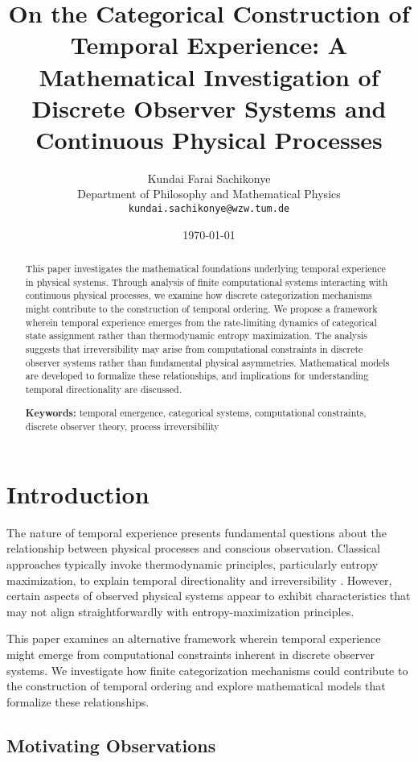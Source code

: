 \documentclass[12pt,a4paper]{article}
\title{On the Categorical Construction of Temporal Experience: A Mathematical Investigation of Discrete Observer Systems and Continuous Physical Processes}
\author{
Kundai Farai Sachikonye\\
Department of Philosophy and Mathematical Physics\\
\texttt{kundai.sachikonye@wzw.tum.de}
}
\date{\today}
\theoremstyle{remark}
\begin{document}
\maketitle

\begin{abstract}
This paper investigates the mathematical foundations underlying temporal experience in physical systems. Through analysis of finite computational systems interacting with continuous physical processes, we examine how discrete categorization mechanisms might contribute to the construction of temporal ordering. We propose a framework wherein temporal experience emerges from the rate-limiting dynamics of categorical state assignment rather than thermodynamic entropy maximization. The analysis suggests that irreversibility may arise from computational constraints in discrete observer systems rather than fundamental physical asymmetries. Mathematical models are developed to formalize these relationships, and implications for understanding temporal directionality are discussed.

\textbf{Keywords:} temporal emergence, categorical systems, computational constraints, discrete observer theory, process irreversibility
\end{abstract}

\tableofcontents

\section{Introduction}

The nature of temporal experience presents fundamental questions about the relationship between physical processes and conscious observation. Classical approaches typically invoke thermodynamic principles, particularly entropy maximization, to explain temporal directionality and irreversibility \cite{boltzmann1896vorlesungen,eddington1928nature}. However, certain aspects of observed physical systems appear to exhibit characteristics that may not align straightforwardly with entropy-maximization principles.

This paper examines an alternative framework wherein temporal experience might emerge from computational constraints inherent in discrete observer systems. We investigate how finite categorization mechanisms could contribute to the construction of temporal ordering and explore mathematical models that formalize these relationships.

\subsection{Motivating Observations}
\end{document}
